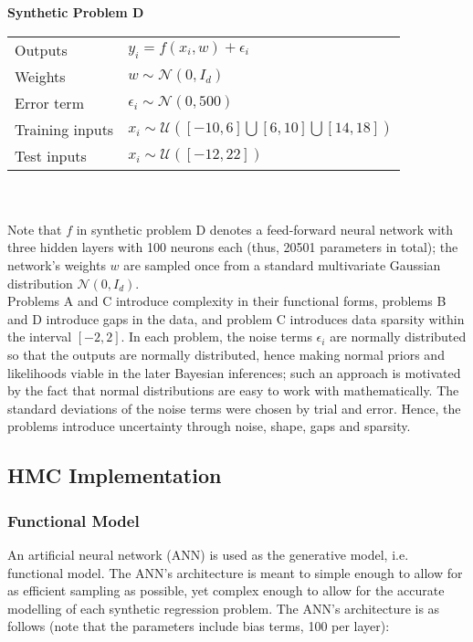 \documentclass[conference]{IEEEtran}
\begin{document}
\textbf{Synthetic Problem D}

\begin{tabular}{m{2.5cm} | m{6cm}}
    Outputs & $y_i = f(x_i, w) + \epsilon_i$ \\
    Weights & $w \sim \mathcal{N}(0, I_d)$ \\
    Error term & $\epsilon_i \sim \mathcal{N}(0, 500)$ \\
    Training inputs & $x_i \sim \mathcal{U}([-10, 6] \bigcup [6, 10] \bigcup [14, 18])$ \\
    Test inputs & $x_i \sim \mathcal{U}([-12, 22])$
\end{tabular} \\~\\

Note that $f$ in synthetic problem D denotes a feed-forward neural network with three hidden layers with 100 neurons each (thus, 20501 parameters in total); the network's weights $w$ are sampled once from a standard multivariate Gaussian distribution $\mathcal{N}(0, I_d)$.\\

Problems A and C introduce complexity in their functional forms, problems B and D introduce gaps in the data, and problem C introduces data sparsity within the interval $[-2, 2]$. In each problem, the noise terms $\epsilon_i$ are normally distributed so that the outputs are normally distributed, hence making normal priors and likelihoods viable in the later Bayesian inferences; such an approach is motivated by the fact that normal distributions are easy to work with mathematically. The standard deviations of the noise terms were chosen by trial and error. Hence, the problems introduce uncertainty through noise, shape, gaps and sparsity.\\

\subsection{HMC Implementation}
\subsubsection{Functional Model}
An artificial neural network (ANN) is used as the generative model, i.e. functional model. The ANN's architecture is meant to simple enough to allow for as efficient sampling as possible, yet complex enough to allow for the accurate modelling of each synthetic regression problem. The ANN's architecture is as follows (note that the parameters include bias terms, 100 per layer):\\
\end{document}
